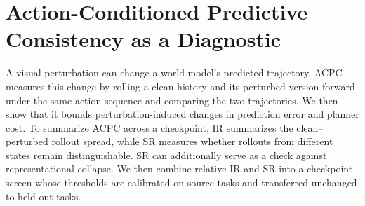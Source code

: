 
\section{Action-Conditioned Predictive Consistency as a Diagnostic}\label{sec:acpc}

A visual perturbation can change a world model's predicted trajectory.
ACPC measures this change by rolling a clean history and its perturbed version
forward under the same action sequence and comparing the two trajectories. We then show that it bounds
perturbation-induced changes in prediction error and planner cost. To summarize ACPC across a checkpoint, IR summarizes the clean--perturbed rollout spread, while SR measures whether rollouts from different states remain distinguishable. SR can additionally serve as a check against representational collapse. We then combine relative IR and SR into a checkpoint screen whose thresholds are calibrated on source tasks and transferred unchanged to held-out tasks.


